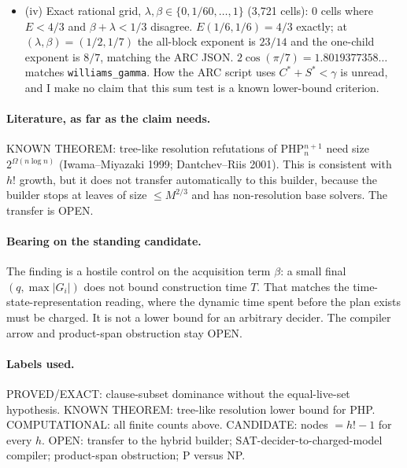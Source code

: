 \documentclass[11pt]{article}
\begin{document}
\begin{itemize}
\item (iv) Exact rational grid, $\lambda,\beta\in\{0,1/60,\dots,1\}$ (3{,}721 cells): 0 cells where $E<4/3$ and $\beta+\lambda<1/3$ disagree. $E(1/6,1/6)=4/3$ exactly; at $(\lambda,\beta)=(1/2,1/7)$ the all-block exponent is $23/14$ and the one-child exponent is $8/7$, matching the ARC JSON. $2\cos(\pi/7)=1.8019377358\ldots$ matches \texttt{williams\_gamma}. How the ARC script uses $C^*+S^*<\gamma$ is unread, and I make no claim that this sum test is a known lower-bound criterion.
\end{itemize}

\paragraph{Literature, as far as the claim needs.} KNOWN THEOREM: tree-like resolution refutations of PHP$^{n+1}_n$ need size $2^{\Omega(n\log n)}$ (Iwama--Miyazaki 1999; Dantchev--Riis 2001). This is consistent with $h!$ growth, but it does not transfer automatically to this builder, because the builder stops at leaves of size $\le M^{2/3}$ and has non-resolution base solvers. The transfer is OPEN.

\paragraph{Bearing on the standing candidate.} The finding is a hostile control on the acquisition term $\beta$: a small final $(q,\max|G_i|)$ does not bound construction time $T$. That matches the time-state-representation reading, where the dynamic time spent before the plan exists must be charged. It is not a lower bound for an arbitrary decider. The compiler arrow and product-span obstruction stay OPEN.

\paragraph{Labels used.} PROVED/EXACT: clause-subset dominance without the equal-live-set hypothesis. KNOWN THEOREM: tree-like resolution lower bound for PHP. COMPUTATIONAL: all finite counts above. CANDIDATE: nodes $=h!-1$ for every $h$. OPEN: transfer to the hybrid builder; SAT-decider-to-charged-model compiler; product-span obstruction; P versus NP.
\end{document}
